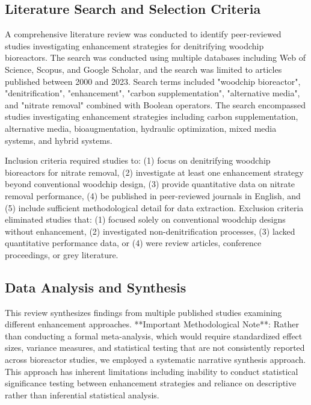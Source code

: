 \documentclass[12pt,a4paper]{article}
\begin{document}
\subsection{Literature Search and Selection Criteria}

A comprehensive literature review was conducted to identify peer-reviewed studies investigating enhancement strategies for denitrifying woodchip bioreactors. The search was conducted using multiple databases including Web of Science, Scopus, and Google Scholar, and the search was limited to articles published between 2000 and 2023. Search terms included "woodchip bioreactor", "denitrification", "enhancement", "carbon supplementation", "alternative media", and "nitrate removal" combined with Boolean operators. The search encompassed studies investigating enhancement strategies including carbon supplementation, alternative media, bioaugmentation, hydraulic optimization, mixed media systems, and hybrid systems.

Inclusion criteria required studies to: (1) focus on denitrifying woodchip bioreactors for nitrate removal, (2) investigate at least one enhancement strategy beyond conventional woodchip design, (3) provide quantitative data on nitrate removal performance, (4) be published in peer-reviewed journals in English, and (5) include sufficient methodological detail for data extraction. Exclusion criteria eliminated studies that: (1) focused solely on conventional woodchip designs without enhancement, (2) investigated non-denitrification processes, (3) lacked quantitative performance data, or (4) were review articles, conference proceedings, or grey literature.

\subsection{Data Analysis and Synthesis}

This review synthesizes findings from multiple published studies examining different enhancement approaches. **Important Methodological Note**: Rather than conducting a formal meta-analysis, which would require standardized effect sizes, variance measures, and statistical testing that are not consistently reported across bioreactor studies, we employed a systematic narrative synthesis approach. This approach has inherent limitations including inability to conduct statistical significance testing between enhancement strategies and reliance on descriptive rather than inferential statistical analysis.
\end{document}
